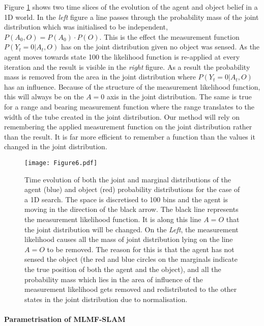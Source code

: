 \documentclass[review]{elsarticle}
\numberwithin{equation}{section}
\begin{document}
Figure \ref{fig:margina_joint_example} shows two time slices of the evolution of the agent and object belief in a 1D world. In the \textit{left}
figure a line passes through the probability mass of the joint distribution which was initialised to be independent,
$P(A_0,O) = P(A_0) \cdot P(O)$. 
This is the effect the measurement function $P(Y_t=0|A_t,O)$ has on the joint distribution given no object was sensed. As the agent 
moves towards state 100 the likelihood function is re-applied at every iteration and the result is visible in the \textit{right} figure. 
As a result the probability mass is removed from the area in the joint distribution where $P(Y_t=0|A_t,O)$ has an influence.
Because of the structure of the measurement likelihood function, this will always be on the $A=0$ axis in the joint distribution. 
The same is true for a range and bearing measurement function where the range translates to the width of the tube created in the 
joint distribution. Our method will rely on remembering the applied measurement function on the joint distribution rather than the result. 
It is far more efficient to remember a function than the values it changed in the
joint distribution.

\begin{figure}
 \centering
 \texttt{[image: Figure6.pdf]}
 \caption{Time evolution of both the joint and marginal distributions of the agent (blue) and object (red) probability distributions for 
 the case of a 1D search. The space is discretised to 100 bins and the agent is moving in the direction of the black arrow. 
 The black line represents the measurement likelihood function. It is along this line $A=O$ that the joint distribution will be
 changed. On the \textit{Left}, the measurement likelihood causes all the mass of joint distribution
 lying on the line $A=O$ to be removed. 
 The reason for this is that the agent has not sensed the object (the red and blue circles on the marginals indicate the true position of
 both the agent and the object), and all the probability mass which lies in the area of influence of the measurement likelihood gets 
 removed and redistributed to the other states in the joint distribution due to normalisation.}
 \label{fig:margina_joint_example}
\end{figure}

\paragraph{Parametrisation of MLMF-SLAM}
\end{document}
